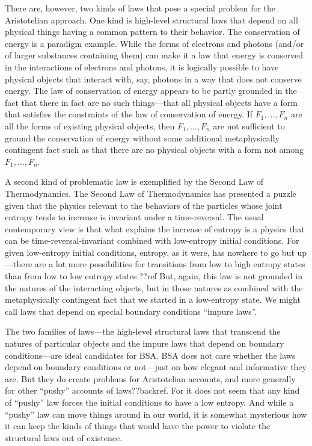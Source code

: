 There are, however, two kinds of laws that pose a special problem for the Aristotelian approach. One kind is high-level
structural laws that depend on all physical things having a common pattern to their behavior. The conservation of energy
is a paradigm example. While the forms of electrons and photons (and/or of larger substances containing them) can make 
it a law that energy is conserved in the interactions of electrons and photons, it is logically possible to have 
physical objects that interact with, say, photons in a way that does not conserve energy. The law of conservation of 
energy appears to be partly grounded in the fact that there in fact are no such things---that all physical objects have a 
form that satisfies the constraints of the law of conservation of energy. If $F_1,...,F_n$ are all the forms
of existing physical objects, then $F_1,...,F_n$ are not sufficient to ground the conservation of energy without some
additional metaphysically contingent fact such as that there are no physical objects with a form not among $F_1,...,F_n$. 

A second kind of problematic law is exemplified by the Second Law of Thermodynamics. The Second Law of Thermodynamics
has presented a puzzle given that the physics relevant to the behaviors of the particles whose joint entropy tends to increase
is invariant under a time-reversal. The usual contemporary view is that what explains the increase of entropy is a physics
that can be time-reversal-invariant combined with low-entropy initial conditions. For given low-entropy initial conditions,
entropy, as it were, has nowhere to go but up---there are a lot more possibilities for transitions from low to high entropy states
than from low to low entropy states.??ref But, again, this law is not grounded in the natures of the interacting objects, 
but in those natures as combined with the metaphysically contingent fact that we started in a low-entropy state.  We might 
call laws that depend on special boundary conditions ``impure laws''. 

The two families of laws---the high-level structural laws that transcend the natures of particular objects and the impure
laws that depend on boundary conditions---are ideal candidates for BSA. BSA does not care whether the laws depend on boundary
conditions or not---just on how elegant and informative they are. But they do create problems for Aristotelian accounts, 
and more generally for other ``pushy'' accounts of laws??backref. For it does not seem that any kind of ``pushy'' law 
forces the initial conditions to have a low entropy. And while a ``pushy'' law can move things around in our world, it is
somewhat mysterious how it can keep the kinds of things that would have the power to violate the structural laws out of 
existence.

